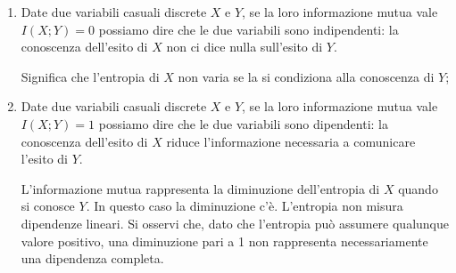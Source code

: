 \begin{enumerate}
	\item Date due variabili casuali discrete \(X\) e \(Y\), se la loro informazione mutua vale \( I(X;Y) = 0 \) possiamo dire che le due variabili sono indipendenti: la conoscenza dell'esito di \(X\) non ci dice nulla sull'esito di \(Y\).

	Significa che l'entropia di \(X\) non varia se la si condiziona alla conoscenza di \(Y\);

	\item Date due variabili casuali discrete \(X\) e \(Y\), se la loro informazione mutua vale \(I(X;Y) = 1\) possiamo dire che le due variabili sono dipendenti: la conoscenza dell'esito di \(X\) riduce l'informazione necessaria a comunicare l'esito di \(Y\).

	L'informazione mutua rappresenta la diminuzione dell'entropia di \(X\) quando si conosce \(Y\). %
	In questo caso la diminuzione c'è. %
	L'entropia non misura dipendenze lineari. %
	Si osservi che, dato che l'entropia può assumere qualunque valore positivo, una diminuzione pari a 1 non rappresenta necessariamente una dipendenza completa.

\end{enumerate}
